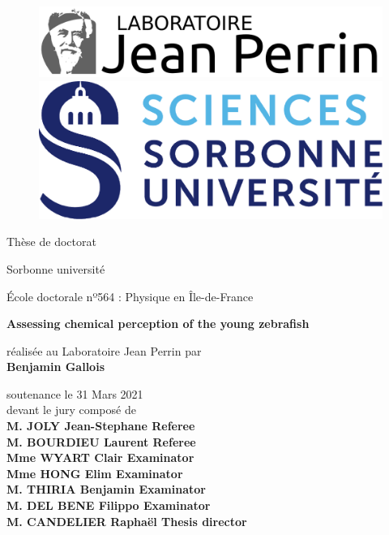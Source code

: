 \thispagestyle{empty}
	
	\begin{figure}[ht]
			\includegraphics[scale=0.5]{cover/ljp.png}
	   \endminipage
			\includegraphics[scale=0.5]{cover/su.png}
		\endminipage
	\end{figure}
	
	\begin{center}
	\vspace{0.3cm}
	\LARGE
	Thèse de doctorat 
	
	\vspace{.1cm}
	\LARGE
	Sorbonne université

	\vspace{.2cm}
	\Large
  École doctorale nº564 : Physique en Île-de-France
	
	\vspace{1cm}	
	\Large
	\textbf{Assessing chemical perception of the young zebrafish}

	\vspace{1cm}
	\normalsize	
	réalisée au Laboratoire Jean Perrin par \\
	\vspace{.2cm}
	\large
	\textbf{Benjamin Gallois}
	
	\vspace{.3cm}
	\normalsize	
	soutenance le 31 Mars 2021 \\
	\vspace{.1cm}
	\normalsize	
	devant le jury composé de \\
	\vspace{.3cm}
	\large
	\textbf{M. JOLY Jean-Stephane \hfill Referee} \\
	\textbf{M. BOURDIEU Laurent \hfill Referee} \\
	\textbf{Mme WYART Clair \hfill Examinator} \\
	\textbf{Mme HONG Elim \hfill Examinator} \\
	\textbf{M. THIRIA Benjamin \hfill Examinator} \\
	\textbf{M. DEL BENE Filippo \hfill Examinator} \\
	\textbf{M. CANDELIER Raphaël \hfill Thesis director} \\
	
	\vspace{1.3cm}
	\end{center}
